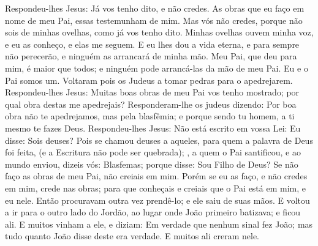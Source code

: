 {  Respondeu-lhes Jesus: Já vos tenho dito, e não credes. As obras que eu faço em nome de meu Pai, essas testemunham de mim.
  Mas vós não credes, porque não sois de minhas ovelhas, como já vos tenho dito.
  Minhas ovelhas ouvem minha voz, e eu as conheço, e elas me seguem.
  E eu lhes dou a vida eterna, e para sempre não perecerão, e ninguém as arrancará de minha mão.
  Meu Pai, que
{} deu para mim, é maior que todos; e ninguém pode arrancá-las da mão de meu Pai.
  Eu e o Pai somos um.
  Voltaram pois os Judeus a tomar pedras para o apedrejarem.
  Respondeu-lhes Jesus: Muitas boas obras de meu Pai vos tenho mostrado; por qual obra destas me apedrejais?
  Responderam-lhe os judeus dizendo: Por boa obra não te apedrejamos, mas pela blasfêmia; e porque sendo tu homem, a ti mesmo te fazes Deus.
  Respondeu-lhes Jesus: Não está escrito em vossa Lei: Eu disse: Sois deuses?
  Pois se
{} chamou deuses a aqueles, para quem a palavra de Deus foi feita, (e a Escritura não pode ser quebrada);
  , a quem o Pai santificou, e ao mundo enviou, dizeis vós: Blasfemas; porque disse: Sou Filho de Deus?
  Se não faço as obras de meu Pai, não creiais em mim.
  Porém se eu as faço, e não credes em mim, crede nas obras; para que conheçais e creiais que o Pai está em mim, e eu nele.
  Então procuravam outra vez prendê-lo; e ele saiu de suas mãos.
  E voltou a ir para o outro lado do Jordão, ao lugar onde João primeiro batizava; e ficou ali.
  E muitos vinham a ele, e diziam: Em verdade que nenhum sinal fez João; mas tudo quanto João disse deste era verdade.
  E muitos ali creram nele.
\par }


